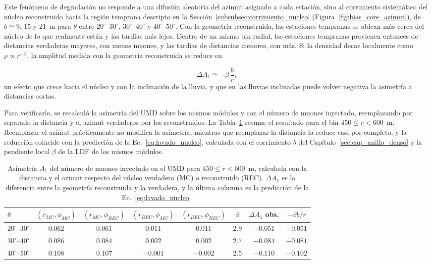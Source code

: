 Este fenómeno de degradación no responde a una difusión aleatoria del azimut asignado a cada estación, sino al corrimiento sistemático del núcleo reconstruido hacia la región temprana descripto en la Sección~\ref{subsubsec:corrimiento_nucleo} (Figura~\ref{fig:bias_core_azimut}), de $b \simeq 9$, $15$ y $21$~m para $\theta$ entre $20^\circ$--$30^\circ$, $30^\circ$--$40^\circ$ y $40^\circ$--$50^\circ$. Con la geometría reconstruida, las estaciones tempranas se ubican más cerca del núcleo de lo que realmente están y las tardías más lejos. Dentro de un mismo bin radial, las estaciones tempranas provienen entonces de distancias verdaderas mayores, con menos muones, y las tardías de distancias menores, con más. Si la densidad decae localmente como $\rho \propto r^{-\beta}$, la amplitud medida con la geometría reconstruida se reduce en

\begin{equation}
	\Delta A_1 \simeq -\beta\,\frac{b}{r},
	\label{eq:lavado_nucleo}
\end{equation}
%
un efecto que crece hacia el núcleo y con la inclinación de la lluvia, y que en las lluvias inclinadas puede volver negativa la asimetría a distancias cortas.

Para verificarlo, se recalculó la asimetría del UMD sobre los mismos módulos y con el número de muones inyectado, reemplazando por separado la distancia y el azimut verdaderos por los reconstruidos. La Tabla~\ref{tab:lavado_nucleo} resume el resultado para el bin $450 \leq r < 600$~m. Reemplazar el azimut prácticamente no modifica la asimetría, mientras que reemplazar la distancia la reduce casi por completo, y la reducción coincide con la predicción de la Ec.~\ref{eq:lavado_nucleo}, calculada con el corrimiento $b$ del Capítulo~\ref{sec:cap_anillo_denso} y la pendiente local $\beta$ de la LDF de los mismos módulos.

\begin{table}[H]
	\centering
	\begin{tabular}{lccccccc}
		\toprule
		$\theta$ & $(r_{MC},\phi_{MC})$ & $(r_{MC},\phi_{REC})$ & $(r_{REC},\phi_{MC})$ & $(r_{REC},\phi_{REC})$ & $\beta$ & $\Delta A_1$ obs. & $-\beta b/r$ \\
		\midrule
		$20^\circ$--$30^\circ$ & $0.062$ & $0.061$ & $0.011$ & $0.011$ & $2.9$ & $-0.051$ & $-0.051$ \\
		$30^\circ$--$40^\circ$ & $0.086$ & $0.084$ & $0.002$ & $0.002$ & $2.7$ & $-0.084$ & $-0.081$ \\
		$40^\circ$--$50^\circ$ & $0.108$ & $0.107$ & $-0.001$ & $-0.002$ & $2.5$ & $-0.110$ & $-0.102$ \\
		\bottomrule
	\end{tabular}
	\caption{Asimetría $A_1$ del número de muones inyectado en el UMD para $450 \leq r < 600$~m, calculada con la distancia y el azimut respecto del núcleo verdadero (MC) o reconstruido (REC). $\Delta A_1$ es la diferencia entre la geometría reconstruida y la verdadera, y la última columna es la predicción de la Ec.~\ref{eq:lavado_nucleo}.}
	\label{tab:lavado_nucleo}
\end{table}

